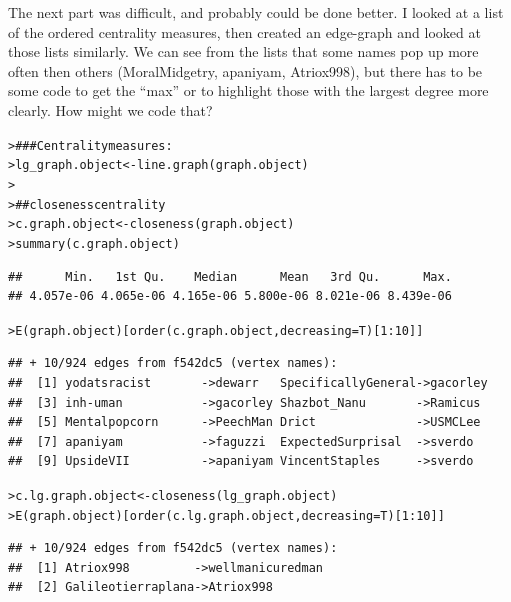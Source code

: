 \documentclass[12pt]{article}\usepackage[]{graphicx}\usepackage[]{color}
\makeatletter
\newcommand{\hlnum}[1]{\textcolor[rgb]{0.82,0.78,0.62}{#1}}%
\newcommand{\hlcom}[1]{\textcolor[rgb]{0.404,0.408,0.42}{#1}}%
\newcommand{\hlopt}[1]{\textcolor[rgb]{0.882,0.878,0.898}{#1}}%
\newcommand{\hlstd}[1]{\textcolor[rgb]{0.882,0.878,0.898}{#1}}%
\newcommand{\hlkwb}[1]{\textcolor[rgb]{0.902,0.675,0.196}{#1}}%
\newcommand{\hlkwc}[1]{\textcolor[rgb]{0.812,0.522,0.388}{#1}}%
\newcommand{\hlkwd}[1]{\textcolor[rgb]{0.733,0.388,0.812}{#1}}%
\newenvironment{kframe}{%
 \def\at@end@of@kframe{}%
 \ifinner\ifhmode%
  \def\at@end@of@kframe{\end{minipage}}%
  \begin{minipage}{\columnwidth}%
 \fi\fi%
 \def\FrameCommand##1{\hskip\@totalleftmargin \hskip-\fboxsep
 \colorbox{shadecolor}{##1}\hskip-\fboxsep
     \hskip-\linewidth \hskip-\@totalleftmargin \hskip\columnwidth}%
 \MakeFramed {\advance\hsize-\width
   \@totalleftmargin\z@ \linewidth\hsize
   \@setminipage}}%
 {\par\unskip\endMakeFramed%
 \at@end@of@kframe}
\newenvironment{knitrout}{}{} %
\makeatother
\begin{document}
\begin{flushleft}
The next part was difficult, and probably could be done better. I looked at a list of the ordered centrality measures, then created an edge-graph and looked at those lists similarly. We can see from the lists that some names pop up more often then others (MoralMidgetry, apaniyam, Atriox998), but there has to be some code to get the ``max'' or to highlight those with the largest degree more clearly. How might we code that? 

\begin{knitrout}
\color{fgcolor}\begin{kframe}
\begin{alltt}
\hlstd{> }\hlcom{### Centrality measures:}
\hlstd{> }\hlstd{lg_graph.object} \hlkwb{<-} \hlkwd{line.graph}\hlstd{(graph.object)}
\hlstd{> }
\hlstd{> }\hlcom{## closeness centrality}
\hlstd{> }\hlstd{c.graph.object} \hlkwb{<-} \hlkwd{closeness}\hlstd{(graph.object)}
\hlstd{> }\hlkwd{summary}\hlstd{(c.graph.object)}
\end{alltt}
\begin{verbatim}
##      Min.   1st Qu.    Median      Mean   3rd Qu.      Max. 
## 4.057e-06 4.065e-06 4.165e-06 5.800e-06 8.021e-06 8.439e-06
\end{verbatim}
\begin{alltt}
\hlstd{> }\hlkwd{E}\hlstd{(graph.object)[}\hlkwd{order}\hlstd{(c.graph.object,} \hlkwc{decreasing}\hlstd{=T)[}\hlnum{1}\hlopt{:}\hlnum{10}\hlstd{]]}
\end{alltt}
\begin{verbatim}
## + 10/924 edges from f542dc5 (vertex names):
##  [1] yodatsracist       ->dewarr   SpecificallyGeneral->gacorley
##  [3] inh-uman           ->gacorley Shazbot_Nanu       ->Ramicus 
##  [5] Mentalpopcorn      ->PeechMan Drict              ->USMCLee 
##  [7] apaniyam           ->faguzzi  ExpectedSurprisal  ->sverdo  
##  [9] UpsideVII          ->apaniyam VincentStaples     ->sverdo
\end{verbatim}
\begin{alltt}
\hlstd{> }\hlstd{c.lg.graph.object} \hlkwb{<-} \hlkwd{closeness}\hlstd{(lg_graph.object)}
\hlstd{> }\hlkwd{E}\hlstd{(graph.object)[}\hlkwd{order}\hlstd{(c.lg.graph.object,} \hlkwc{decreasing}\hlstd{=T)[}\hlnum{1}\hlopt{:}\hlnum{10}\hlstd{]]}
\end{alltt}
\begin{verbatim}
## + 10/924 edges from f542dc5 (vertex names):
##  [1] Atriox998         ->wellmanicuredman  
##  [2] Galileotierraplana->Atriox998         

\end{verbatim}
\end{kframe}
\end{knitrout}
\end{flushleft}
\end{document}
